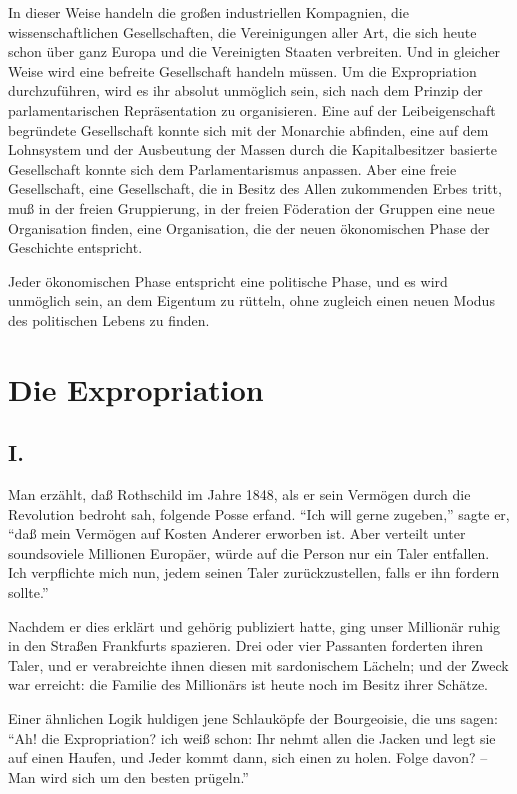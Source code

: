 \documentclass{scrbook}
\begin{document}
In dieser Weise handeln die großen industriellen Kompagnien, die wissenschaftlichen Gesellschaften, die Vereinigungen aller Art, die sich heute schon über ganz Europa und die Vereinigten Staaten verbreiten. Und in gleicher Weise wird eine befreite Gesellschaft handeln müssen. Um die Expropriation durchzuführen, wird es ihr absolut unmöglich sein, sich nach dem Prinzip der parlamentarischen Repräsentation zu organisieren. Eine auf der Leibeigenschaft begründete Gesellschaft konnte sich mit der Monarchie abfinden, eine auf dem Lohnsystem und der Ausbeutung der Massen durch die Kapitalbesitzer basierte Gesellschaft konnte sich dem Parlamentarismus anpassen. Aber eine freie Gesellschaft, eine Gesellschaft, die in Besitz des Allen zukommenden Erbes tritt, muß in der freien Gruppierung, in der freien Föderation der Gruppen eine neue Organisation finden, eine Organisation, die der neuen ökonomischen Phase der Geschichte entspricht.

Jeder ökonomischen Phase entspricht eine politische Phase, und es wird unmöglich sein, an dem Eigentum zu rütteln, ohne zugleich einen neuen Modus des politischen Lebens zu finden.

\chapter{Die Expropriation}
\section*{I.}

Man erzählt, daß Rothschild im Jahre 1848, als er sein Vermögen durch die Revolution bedroht sah, folgende Posse erfand. ``Ich will gerne zugeben,'' sagte er, ``daß mein Vermögen auf Kosten Anderer erworben ist. Aber verteilt unter soundsoviele Millionen Europäer, würde auf die Person nur ein Taler entfallen. Ich verpflichte mich nun, jedem seinen Taler zurückzustellen, falls er ihn fordern sollte.''

Nachdem er dies erklärt und gehörig publiziert hatte, ging unser Millionär ruhig in den Straßen Frankfurts spazieren. Drei oder vier Passanten forderten ihren Taler, und er verabreichte ihnen diesen mit sardonischem Lächeln; und der Zweck war erreicht: die Familie des Millionärs ist heute noch im Besitz ihrer Schätze.

Einer ähnlichen Logik huldigen jene Schlauköpfe der Bourgeoisie, die uns sagen: ``Ah! die Expropriation? ich weiß schon: Ihr nehmt allen die Jacken und legt sie auf einen Haufen, und Jeder kommt dann, sich einen zu holen. Folge davon? – Man wird sich um den besten prügeln.''
\end{document}
